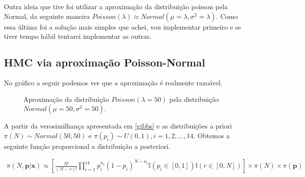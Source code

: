\documentclass[a4paper,12pt,twoside]{article}
\begin{document}
Outra ideia que tive foi utilizar a aproximação da distribuição poisson pela Normal, da seguinte maneira $Poisson(\lambda)\approx Normal(\mu=\lambda,\sigma^2=\lambda)$. Como essa última foi a solução mais simples que achei, vou implementar primeiro e se tiver tempo hábil tentarei implementar as outras.

\subsection{HMC via aproximação Poisson-Normal}

No gráfico a seguir podemos ver que a aproximação é realmente razoável.
\begin{figure}[H]
  \centering

  \captionsetup{font=footnotesize,width=15cm}
  \caption{\small Aproximação da distribuição $Poisson(\lambda=50)$ pela distribuição $Normal(\mu=50,\sigma^2=50)$.}
\end{figure}

A partir da verosimilhança apresentada em \ref{gibbs} e as distribuições a priori $\pi(N)\sim Normal(50,50)$ e $\pi(p_i)\sim U(0,1),i=1,2,...,14$. Obtemos a seguinte função proporcional a distribuição a posteriori.

\begin{align*}
\pi(N,\mathbf{p|x})\propto \left[\frac{N!}{(N-r)!}\prod_{i=1}^{14}p_{i}^{n_i}(1-p_i)^{N-n_i}\mathds{I}(p_i \in [0,1])\mathds{I}(r \in [0,N])\right] \times \pi(N) \times \pi(\mathbf{p}) 
\end{align*}
\end{document}
